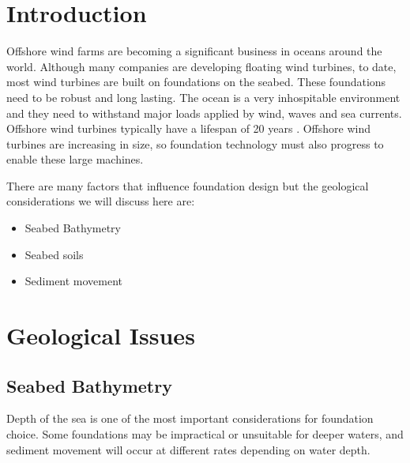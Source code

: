 \documentclass[12pt]{article} %
\newlength{\wideitemsep}
\let\olditem\item
\renewcommand{\item}{\setlength{\itemsep}{\wideitemsep}\olditem}
\begin{document}




\section{Introduction} %
Offshore wind farms are becoming a significant business in oceans around the world.
Although many companies are developing floating wind turbines, to date, most wind turbines are built on foundations on the seabed.
These foundations need to be robust and long lasting. The ocean is a very inhospitable environment and they need to withstand major loads applied by wind, waves and sea currents. Offshore wind turbines typically have a lifespan of 20 years \cite{Siemens:1}. Offshore wind turbines are increasing in size, so foundation technology must also progress to enable these large machines.

There are many factors that influence foundation design but the geological considerations we will discuss here are:
  \begin{itemize}
    \item Seabed Bathymetry
    \item Seabed soils
    \item Sediment movement
  \end{itemize}

\section{Geological Issues}

\subsection{Seabed Bathymetry}
Depth of the sea is one of the most important considerations for foundation choice. Some foundations may be impractical or unsuitable for deeper waters, and sediment movement will occur at different rates depending on water depth.
\end{document}
